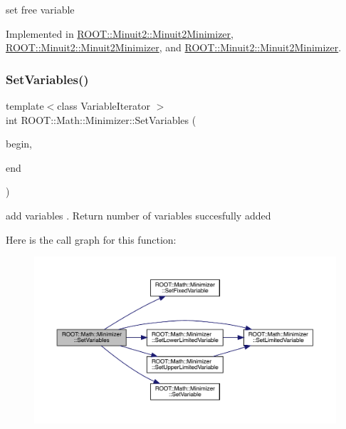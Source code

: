 set free variable 



Implemented in \mbox{\hyperlink{classROOT_1_1Minuit2_1_1Minuit2Minimizer_a951ad856f74ded3c64836fa28fdf9bb5}{R\+O\+O\+T\+::\+Minuit2\+::\+Minuit2\+Minimizer}}, \mbox{\hyperlink{classROOT_1_1Minuit2_1_1Minuit2Minimizer_a951ad856f74ded3c64836fa28fdf9bb5}{R\+O\+O\+T\+::\+Minuit2\+::\+Minuit2\+Minimizer}}, and \mbox{\hyperlink{classROOT_1_1Minuit2_1_1Minuit2Minimizer_a951ad856f74ded3c64836fa28fdf9bb5}{R\+O\+O\+T\+::\+Minuit2\+::\+Minuit2\+Minimizer}}.

\mbox{\label{classROOT_1_1Math_1_1Minimizer_a314040274ee907fba52726275a28c9f7}} 
\subsubsection{\texorpdfstring{SetVariables()}{SetVariables()}\hspace{0.1cm}{\footnotesize\ttfamily [1/3]}}
{\footnotesize\ttfamily template$<$class Variable\+Iterator $>$ \\
int R\+O\+O\+T\+::\+Math\+::\+Minimizer\+::\+Set\+Variables (\begin{DoxyParamCaption}\item[{const Variable\+Iterator \&}]{begin,  }\item[{const Variable\+Iterator \&}]{end }\end{DoxyParamCaption})\hspace{0.3cm}{\ttfamily [inline]}}



add variables . Return number of variables succesfully added 

Here is the call graph for this function\+:
\nopagebreak
\begin{figure}[H]
\begin{center}
\leavevmode
\includegraphics[width=350pt]{dc/dc4/classROOT_1_1Math_1_1Minimizer_a314040274ee907fba52726275a28c9f7_cgraph}
\end{center}
\end{figure}
\mbox{\label{classROOT_1_1Math_1_1Minimizer_a314040274ee907fba52726275a28c9f7}} 
